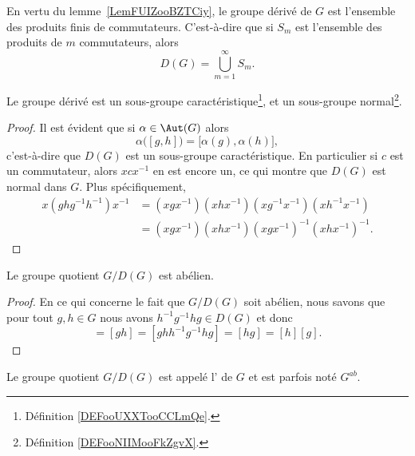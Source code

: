 En vertu du lemme~\ref{LemFUIZooBZTCiy}, le groupe dérivé de \( G\) est l'ensemble des produits finis de commutateurs. C'est-à-dire que si \( S_m\) est l'ensemble des produits de \( m\) commutateurs, alors
\begin{equation}
    D(G)=\bigcup_{m=1}^{\infty}S_m.
\end{equation}

\begin{lemma}   \label{LemMMOCooDJJJhy}
    Le groupe dérivé est un sous-groupe caractéristique\footnote{Définition \ref{DEFooUXXTooCCLmQe}.}, et un sous-groupe normal\footnote{Définition \ref{DEFooNIIMooFkZgvX}.}.
\end{lemma}

\begin{proof}
    Il est évident que si \( \alpha\in\Aut(G)\) alors
    \begin{equation}
        \alpha\big( [g,h] \big)=\big[ \alpha(g),\alpha(h) \big],
    \end{equation}
    c'est-à-dire que \( D(G)\) est un sous-groupe caractéristique. En particulier si \( c\) est un commutateur, alors \( xcx^{-1}\) en est encore un, ce qui montre que \( D(G)\) est normal dans \( G\). Plus spécifiquement,
    \begin{subequations}
        \begin{align}
        x(ghg^{-1}h^{-1})x^{-1}&=(xgx^{-1})(xhx^{-1})(xg^{-1}x^{-1})(xh^{-1}x^{-1})\\
        &=(xgx^{-1})(xhx^{-1})(xgx^{-1})^{-1}(xhx^{-1})^{-1}.
        \end{align}
    \end{subequations}
\end{proof}

\begin{proposition}\label{PropAPRGooHBkELf}
    Le groupe quotient \( G/D(G)\) est abélien.
\end{proposition}

\begin{proof}
    En ce qui concerne le fait que \( G/D(G)\) soit abélien, nous savons que pour tout \( g,h\in G\) nous avons \( h^{-1}g^{-1}hg\in D(G)\) et donc
    \begin{equation}
        [g][h]=[gh]=[ghh^{-1}g^{-1}hg]=[hg]=[h][g].
    \end{equation}
\end{proof}

Le groupe quotient \( G/D(G)\) est appelé l' de \( G\) et est parfois noté \( G^{ab}\).

